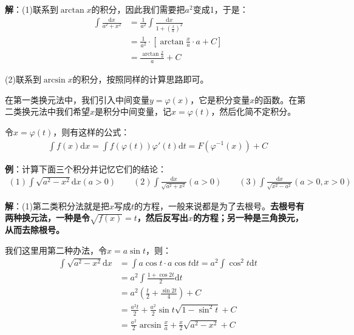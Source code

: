 \documentclass{ctexart}
\let\oldtextbf\textbf %
\renewcommand{\textbf}[1]{\textcolor{btex}{\oldtextbf{#1}}} %
\begin{document}
\textbf{解}：(1)联系到$\arctan x$的积分，因此我们需要把$a^2$变成1，于是：
\begin{align*}
    \int\frac{\mathrm{d}x}{a^2+x^2}&=\frac{1}{a^2}\int\frac{\mathrm{d}x}{1+(\frac{x}{a})^2}\\
    &=\frac{1}{a^2}\cdot[ \arctan\frac{x}{a}\cdot a+C]\\
    &=\frac{\arctan\frac{x}{a}}{a}+C
\end{align*}

(2)联系到$\arcsin x$的积分，按照同样的计算思路即可。

在第一类换元法中，我们引入中间变量$y=\varphi(x)$，它是积分变量$x$的函数。在第二类换元法中我们希望$x$是积分中间变量，记$x=\varphi(t)$，然后化简不定积分。
\begin{tcolorbox}[
    colback=bac2,     %
    colframe=fra2,   %
    coltitle=white,             %
    coltext=tex2,
    title=不定积分第二换元法,
    fonttitle=\bfseries,        %
arc=3mm,                     %
breakable
]

令$x=\varphi(t)$，则有这样的公式：
\begin{align*}
    \int f(x)\mathrm{d}x=\int f(\varphi(t))\varphi'(t)\mathrm{d}t
    =F(\varphi^{-1}(x))+C
\end{align*}
\end{tcolorbox}

\textbf{例}：计算下面三个积分并记忆它们的结论：
\begin{align*}
    (1)\int \sqrt{a^2-x^2}\mathrm{d}x(a>0)\qquad (2)\int\frac{\mathrm{d}x}{\sqrt{a^2+x^2}}(a>0)\qquad (3)\int\frac{\mathrm{d}x}{\sqrt{x^2-a^2}}(a>0,x>0)
\end{align*}

\textbf{解}：(1)第二类积分法就是把$x$写成$t$的方程，一般来说都是为了去根号。\textbf{去根号有两种换元法，一种是令$\sqrt{f(x)}=t$，然后反写出$x$的方程；另一种是三角换元，从而去除根号。}

我们这里用第二种办法，令$x=a\sin t$，则：
\begin{align*}
    \int\sqrt{a^2-x^2}\mathrm{d}x&=\int a\cos t\cdot a\cos t\mathrm{d}t=a^2\int \cos^2 t\mathrm{d}t\\
    &=a^2\int \frac{1+\cos 2t}{2}\mathrm{d}t\\
    &=a^2(\frac{t}{2}+\frac{\sin 2t}{4})+C\\
    &=\frac{a^2t}{2}+\frac{a^2}{2}\sin t\sqrt{1-\sin^2 t}+C\\
    &=\frac{a^2}{2}\arcsin\frac{x}{a}+\frac{x}{2}\sqrt{a^2-x^2}+C
\end{align*}
\end{document}
